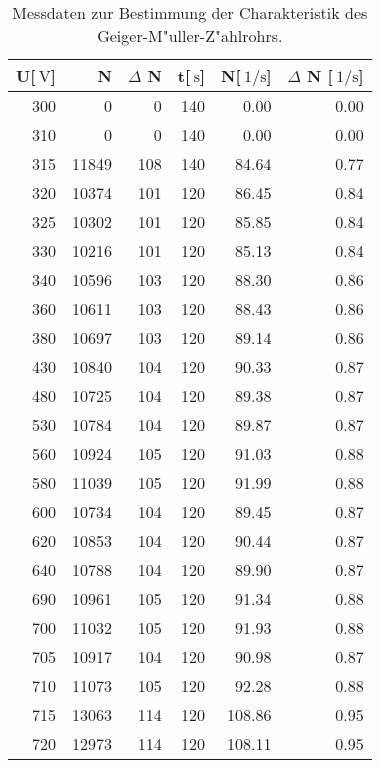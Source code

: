 
\begin{table}[!h]
\begin{center}
\begin{tabular}{|r|r|r|r|r|r|}
\hline
U[$\SI{}{\volt}$] &	N & $\Delta$ N & t[$\SI{}{\second}$] & N[$\SI{}{1\per\second}$] & $\Delta$ N [$\SI{}{1\per\second}$]\\
\hline
\hline
300	 &   0	    & 0	&  140 & 0.00 & 0.00\\
310	 &   0	    & 0	&  140 & 0.00 & 0.00\\
315	 &   11849	& 108	&  140 & 84.64	& 0.77\\
320	 &   10374	& 101	&  120 & 86.45	& 0.84\\
325	 &   10302	& 101	&  120 & 85.85	& 0.84\\
330	 &   10216	& 101	&  120 & 85.13	& 0.84\\
340	 &   10596	& 103	&  120 & 88.30	& 0.86\\
360	 &   10611	& 103	&  120 & 88.43	& 0.86\\
380	 &   10697	& 103	&  120 & 89.14	& 0.86\\
430	 &   10840	& 104	&  120 & 90.33	& 0.87\\
480	 &   10725	& 104	&  120 & 89.38	& 0.87\\
530	 &   10784	& 104	&  120 & 89.87	& 0.87\\
560	 &   10924	& 105	&  120 & 91.03	& 0.88\\
580	 &   11039	& 105	&  120 & 91.99	& 0.88\\
600	 &   10734	& 104	&  120 & 89.45	& 0.87\\
620	 &   10853	& 104	&  120 & 90.44	& 0.87\\
640	 &   10788	& 104	&  120 & 89.90	& 0.87\\
690	 &   10961	& 105	&  120 & 91.34	& 0.88\\
700	 &   11032	& 105	&  120 & 91.93	& 0.88\\
705	 &   10917	& 104	&  120 & 90.98	& 0.87\\
710	 &   11073	& 105	&  120 & 92.28	& 0.88\\
715	 &   13063	& 114	&  120 & 108.86 &0.95\\
720	 &   12973	& 114	&  120 & 108.11 &0.95\\
\hline
\end{tabular}
\caption[Aufgabe a]{Messdaten zur Bestimmung der Charakteristik des Geiger-M"uller-Z"ahlrohrs.}
\label{tabellea}
\end{center}
\end{table}